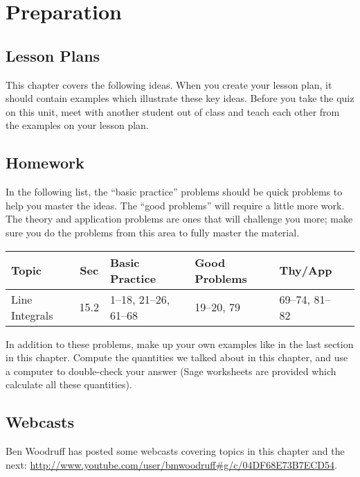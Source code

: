 \section{Preparation}

\subsection{Lesson Plans}

This chapter covers the following ideas. When you create your lesson plan, it should contain examples which illustrate these key ideas. Before you take the quiz on this unit, meet with another student out of class and teach each other from the examples on your lesson plan. 





\subsection{Homework}

In the following list, the ``basic practice'' problems should be quick
problems to help you master the ideas.  The ``good problems'' will
require a little more work.  The theory and application problems are
ones that will challenge you more; make sure you do the problems from
this area to fully master the material.  

{\noindent %
\begin{tabular}{|l|c|l|l|l|l|}\hline
Topic &Sec &Basic Practice &Good Problems &Thy/App \\\hline
Line Integrals & 15.2&1--18, 21--26, 61--68 & 19--20, 79 & 69--74, 81--82\\\hline
\end{tabular}

}

In addition to these problems, make up your own examples like in the
last section in this chapter.  Compute the quantities we talked about
in this chapter, and use a computer to double-check your answer (Sage
worksheets are provided which calculate all these quantities).

\subsection{Webcasts}

Ben Woodruff has posted some webcasts covering topics in this chapter
and the next: \url{http://www.youtube.com/user/bmwoodruff#g/c/04DF68E73B7ECD54}.

